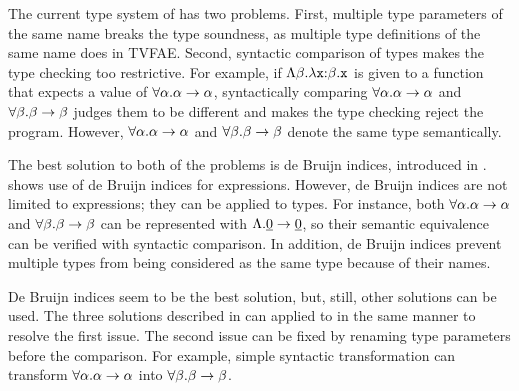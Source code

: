 The current type system of \lang has two problems. First, multiple type
parameters of the same name breaks the type soundness, as multiple type
definitions of the same name does in \textsf{TVFAE}. Second, syntactic
comparison of types makes the type checking too restrictive. For example, if
$\Lambda\beta.\lambda\texttt{x}{:}\beta.\texttt{x}$ is given to a function
that expects a value of $\forall\alpha.\alpha\rightarrow\alpha$, syntactically comparing
$\forall\alpha.\alpha\rightarrow\alpha$ and $\forall\beta.\beta\rightarrow\beta$ judges them to be
different and makes the type checking reject the program. However,
$\forall\alpha.\alpha\rightarrow\alpha$ and $\forall\beta.\beta\rightarrow\beta$ denote the same type
semantically.

The best solution to both of the problems is de Bruijn indices, introduced in
.
 shows use of de Bruijn indices for
expressions. However, de Bruijn indices are not limited to expressions; they
can be applied to types. For instance, both $\forall\alpha.\alpha\rightarrow\alpha$
and $\forall\beta.\beta\rightarrow\beta$ can be represented with
$\Lambda.\underline{0}\rightarrow\underline{0}$, so their semantic equivalence
can be verified with syntactic comparison. In addition, de Bruijn indices
prevent multiple types from being considered as the same type because of their
names.

De Bruijn indices seem to be the best solution, but, still, other solutions can
be used. The three solutions described in  can
applied to \lang in the same manner to resolve the first issue. The second issue
can be fixed by renaming type parameters before the comparison. For example, simple syntactic
transformation can transform $\forall\alpha.\alpha\rightarrow\alpha$
into $\forall\beta.\beta\rightarrow\beta$.





